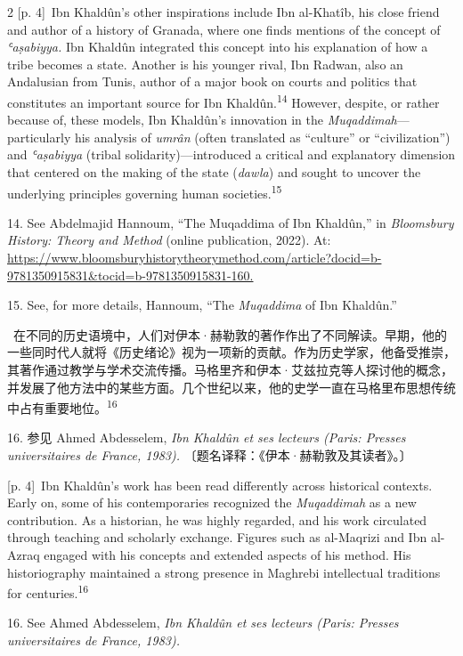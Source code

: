\documentclass[10pt,a4paper]{article}
\begin{document}
\begin{paracol}{2}
\switchcolumn
{\scriptsize\color{gray} [p. 4]}\ Ibn Khaldûn’s other inspirations include Ibn al-Khatîb, his close friend and author of a history of Granada, where one finds mentions of the concept of \textit{ʿaṣabiyya.} Ibn Khaldûn integrated this concept into his explanation of how a tribe becomes a state. Another is his younger rival, Ibn Radwan, also an Andalusian from Tunis, author of a major book on courts and politics that constitutes an important source for Ibn Khaldûn.\nobreak\textsuperscript{14} However, despite, or rather because of, these models, Ibn Khaldûn’s innovation in the \textit{Muqaddimah}—particularly his analysis of \textit{umrân} (often translated as “culture” or “civilization”) and \textit{ʿaṣabiyya} (tribal solidarity)—introduced a critical and explanatory dimension that centered on the making of the state (\textit{dawla}) and sought to uncover the underlying principles governing human societies.\nobreak\textsuperscript{15}\par{\small 14. See Abdelmajid Hannoum, “The Muqaddima of Ibn Khaldûn,” in \textit{Bloomsbury History: Theory and Method} (online publication, 2022). At: \url{https://www.bloomsburyhistorytheorymethod.com/article?docid=b-9781350915831&tocid=b-9781350915831-160.}\par}{\small 15. See, for more details, Hannoum, “The \textit{Muqaddima} of Ibn Khaldûn.”\par}
\switchcolumn*
{\scriptsize\color{gray} [p. 4]}\ 在不同的历史语境中，人们对伊本·赫勒敦的著作作出了不同解读。早期，他的一些同时代人就将《历史绪论》视为一项新的贡献。作为历史学家，他备受推崇，其著作通过教学与学术交流传播。马格里齐和伊本·艾兹拉克等人探讨他的概念，并发展了他方法中的某些方面。几个世纪以来，他的史学一直在马格里布思想传统中占有重要地\mbox{位。\textsuperscript{16}}\par{\small 16. 参见 Ahmed Abdesselem, \textit{Ibn Khaldûn et ses lecteurs (Paris: Presses universitaires de France, 1983).} 〔题名译释：《伊本·赫勒敦及其读者》。〕\par}
\switchcolumn
{\scriptsize\color{gray} [p. 4]}\ Ibn Khaldûn’s work has been read differently across historical contexts. Early on, some of his contemporaries recognized the \textit{Muqaddimah} as a new contribution. As a historian, he was highly regarded, and his work circulated through teaching and scholarly exchange. Figures such as al-Maqrizi and Ibn al-Azraq engaged with his concepts and extended aspects of his method. His historiography maintained a strong presence in Maghrebi intellectual traditions for centuries.\nobreak\textsuperscript{16}\par{\small 16. See Ahmed Abdesselem, \textit{Ibn Khaldûn et ses lecteurs (Paris: Presses universitaires de France, 1983).}\par}

\end{paracol}
\end{document}
